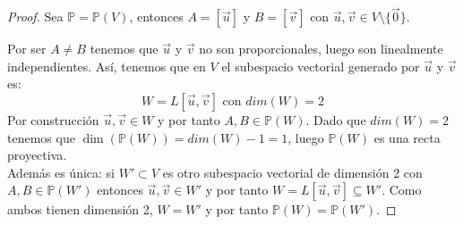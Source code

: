 \begin{proof}
    Sea $\mathbb{P} = \mathbb{P}(V)$, entonces $A = [\vec{u}]$ y $B = [\vec{v}]$ con $\vec{u}, \vec{v} \in V \setminus \{\vec{0}\}$.

    \begin{center}
    \end{center}

    Por ser $A \neq B$ tenemos que $\vec{u}$ y $\vec{v}$ no son proporcionales, luego son linealmente independientes. Así, tenemos que en $V$ el subespacio vectorial generado por $\vec{u}$ y $\vec{v}$ es:
    $$ W = L[\vec{u}, \vec{v}] \text{ con } dim(W) = 2 $$
    Por construcción $\vec{u}, \vec{v} \in W$ y por tanto $A, B \in \mathbb{P}(W)$. Dado que $dim(W) = 2$ tenemos que $\dim(\mathbb{P}(W)) = dim(W) - 1 = 1$, luego $\mathbb{P}(W)$ es una recta proyectiva.\\
    Además es única: si $W' \subset V$ es otro subespacio vectorial de dimensión 2 con $A, B \in \mathbb{P}(W')$ entonces $\vec{u}, \vec{v} \in W'$ y por tanto $W = L[\vec{u}, \vec{v}] \subseteq W'$. Como ambos tienen dimensión 2, $W = W'$ y por tanto $\mathbb{P}(W) = \mathbb{P}(W')$.
\end{proof}

